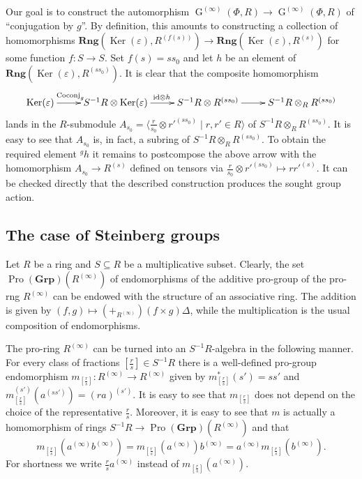 \documentclass{article}
\numberwithin{equation}{section}
\theoremstyle{definition}
\theoremstyle{remark}
\DeclareMathOperator\Ker{Ker}
\DeclareMathOperator\GG{G}
\DeclareMathOperator{\Pro}{Pro}
\newcommand{\Group}{\mathbf{Grp}}
\newcommand{\Rng}{\mathbf{Rng}}
\newcommand{\up}[2]{{^{#1}\!{#2}}}
\begin{document}
Our goal is to construct the automorphism $\GG^{(\infty)}(\Phi, R) \to \GG^{(\infty)}(\Phi, R)$ of ``conjugation by $g$''. By definition, this amounts to constructing a collection of homomorphisms
$\Rng(\Ker(\varepsilon), R^{(f(s))}) \to \Rng(\Ker(\varepsilon), R^{(s)})$ for some function $f \colon S \to S$. Set $f(s) = ss_0$ and let $h$ be an element of $\Rng(\Ker(\varepsilon), R^{(ss_0)})$. It is clear that the composite homomorphism
\[\xymatrix{ \Ker(\varepsilon) \ar[r]^(0.4){\mathrm{Coconj}_g} & S^{-1}R \otimes \Ker(\varepsilon) \ar[r]^{\mathrm{id}\otimes h} & S^{-1}R \otimes R^{(ss_0)} \ar[r] & S^{-1}R \otimes_R R^{(ss_0)}}\]
lands in the $R$-submodule $A_{s_0} = \langle \frac{r}{s_0} \otimes r'^{(ss_0)}\mid r, r' \in R \rangle$ of $S^{-1}R \otimes_R R^{(ss_0)}$. It is easy to see that $A_{s_0}$ is, in fact, a subring of $S^{-1}R \otimes_R R^{(ss_0)}$. To obtain the required element $\up g h$ it remains to postcompose the above arrow with the homomorphism $A_{s_0} \to R^{(s)}$ defined on tensors via $\frac{r}{s_0} \otimes r'^{(ss_0)} \mapsto rr'^{(s)}$. It can be checked directly that the described construction produces the sought group action.

\subsection{The case of Steinberg groups}
Let \(R\) be a ring and \(S \subseteq R\) be a multiplicative subset.
Clearly, the set $\Pro(\Group)(R^{(\infty)})$ of endomorphisms of the additive pro-group of the pro-rng $R^{(\infty)}$ can be endowed with the structure of an associative ring. The addition is given by  $(f, g) \mapsto (+_{R^{(\infty)}}) (f\times g) \Delta$, while the multiplication is the usual composition of endomorphisms.

The pro-ring $R^{(\infty)}$ can be turned into an \(S^{-1} R\)-algebra in the following manner. For every class of fractions \([\frac rs] \in S^{-1} R\) there is a well-defined pro-group endomorphism \(m_{[\frac rs]} \colon R^{(\infty)} \to R^{(\infty)}\) given by \(m_{[\frac rs]}^*(s') = ss'\) and \(m_{[\frac rs]}^{(s')}(a^{(ss')}) = (ra)^{(s')}\). It is easy to see that $m_{[\frac{r}{s}]}$ does not depend on the choice of the representative \(\tfrac r s\). Moreover, it is easy to see that \(m\) is actually a homomorphism of rings \(S^{-1} R \to \Pro(\Group)(R^{(\infty)})\) and that 
\begin{equation} \label{eq:m-mult} m_{[\frac rs]}(a^{(\infty)} b^{(\infty)}) = m_{[\frac rs]}(a^{(\infty)}) b^{(\infty)} = a^{(\infty)} m_{[\frac rs]}(b^{(\infty)}).\end{equation}
For shortness we write \(\frac rs a^{(\infty)}\) instead of \(m_{[\frac rs]}(a^{(\infty)})\). 
\end{document}
